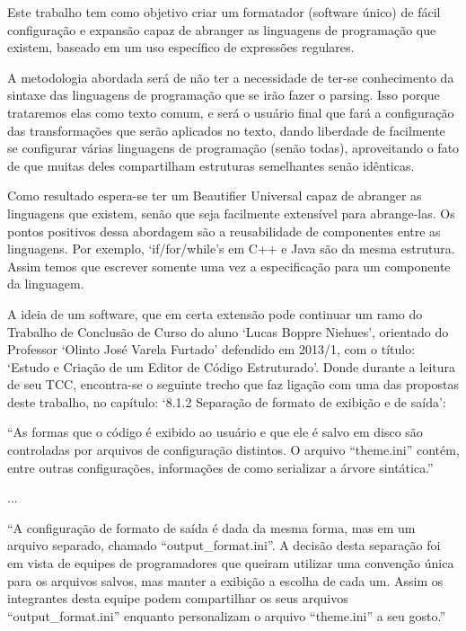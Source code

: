 

    Este trabalho tem como objetivo criar um formatador (software único) de fácil configuração e
    expansão capaz de abranger as linguagens de programação que existem, baseado em um uso
    específico de expressões regulares.

    A metodologia abordada será de não ter a necessidade de ter-se conhecimento da sintaxe das
    linguagens de programação que se irão fazer o parsing. Isso porque trataremos elas como texto
    comum, e será o usuário final que fará a configuração das transformações que serão aplicados no
    texto, dando liberdade de facilmente se configurar várias linguagens de programação (senão
    todas), aproveitando o fato de que muitas deles compartilham estruturas semelhantes senão
    idênticas.

    Como resultado espera-se ter um Beautifier Universal capaz de abranger as linguagens que
    existem, senão que seja facilmente extensível para abrange-las. Os pontos positivos dessa
    abordagem são a reusabilidade de componentes entre as linguagens. Por exemplo, `if/for/while's
    em C++ e Java são da mesma estrutura. Assim temos que escrever somente uma vez a especificação
    para um componente da linguagem.

    A ideia de um software, que em certa extensão pode continuar um ramo do Trabalho de Conclusão de
    Curso do aluno `Lucas Boppre Niehues', orientado do Professor `Olinto José Varela Furtado'
    defendido em 2013/1, com o título: `Estudo e Criação de um Editor de Código Estruturado'. Donde
    durante a leitura de seu TCC, encontra-se o seguinte trecho que faz ligação com uma das
    propostas deste trabalho, no capítulo: `8.1.2 Separação de formato de exibição e de saída':

    \medskip
    \begin{myquote}
    ``As formas que o código é exibido ao usuário e que ele é salvo em disco são controladas
    por arquivos de configuração distintos. O arquivo ``theme.ini'' contém, entre outras
    configurações, informações de como serializar a árvore sintática.''
    \end{myquote}

    \vspace{-5mm}
    ...
    \begin{myquote}
    ``A configuração de formato de saída é dada da mesma forma, mas em um arquivo
    separado, chamado ``output\_format.ini''. A decisão desta separação foi em vista de equipes
    de programadores que queiram utilizar uma convenção única para os arquivos salvos,
    mas manter a exibição a escolha de cada um. Assim os integrantes desta equipe podem
    compartilhar os seus arquivos ``output\_format.ini'' enquanto personalizam o arquivo
    ``theme.ini'' a seu gosto.''
    \end{myquote}

